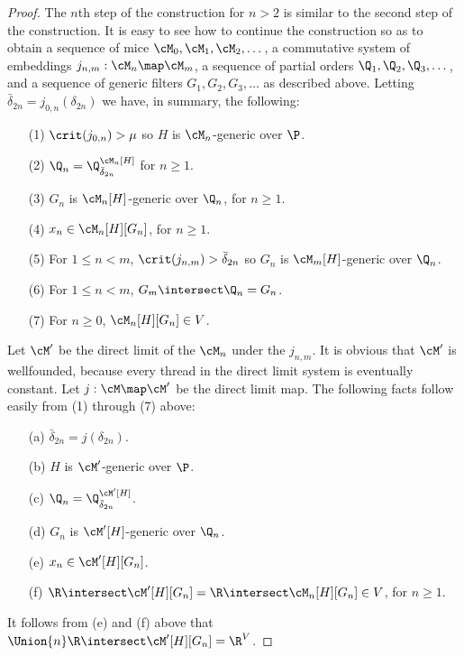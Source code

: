 \begin{proof}
The $n$th step of the construction for $n>2$ is similar to the
second step of the construction. It is easy to see how to continue the
construction so as to obtain a sequence of mice
$\cM_0, \cM_1, \cM_2, \dots$,  a commutative system of embeddings
$j_{n,m}:\cM_n\map\cM_m$, a sequence of partial orders
$\Q_1, \Q_2, \Q_3, \dots$, and a sequence of generic filters
$G_1, G_2, G_3, \dots$ as described above. Letting
$\bar{\delta}_{2n}=j_{0,n}(\delta_{2n})$ we have, in summary, the following:
\begin{itemize}
\item[(1)] $\crit(j_{0,n})>\mu$ so $H$ is $\cM_n$-generic over $\P$.
\item[(2)] $\Q_n = \Q_{\bar{\delta}_{2n}}^{\cM_n[H]}$ for $n\geq 1$.
\item[(3)] $G_n$ is $\cM_n[H]$-generic over $\Q_n$, for $n\geq 1$.
\item[(4)] $x_n\in\cM_n[H][G_n]$, for $n\geq 1$.
\item[(5)] For $1\leq n < m$, $\crit(j_{n,m})>\bar{\delta}_{2n}$ so
           $G_n$ is $\cM_m[H]$-generic over $\Q_n$.
\item[(6)] For $1\leq n < m$, $G_m\intersect \Q_n= G_n$.
\item[(7)] For $n\geq 0$, $\cM_n[H][G_n]\in V$.
\end{itemize}

Let $\cM^{\prime}$ be the direct limit of the $\cM_n$ under the
$j_{n,m}$. It is obvious that $\cM^{\prime}$ is wellfounded, because
every thread in the direct limit system is eventually constant.
Let $j:\cM\map\cM^{\prime}$ be the direct limit map.
The
following facts follow easily from (1) through (7) above:
\begin{itemize}
\item[(a)] $\bar{\delta}_{2n} = j(\delta_{2n})$.
\item[(b)] $H$ is $\cM^\prime$-generic over $\P$.
\item[(c)] $\Q_n=\Q_{\bar{\delta}_{2n}}^{\cM^{\prime}[H]}$.
\item[(d)] $G_n$ is $\cM^{\prime}[H]$-generic over $\Q_n$.
\item[(e)] $x_n\in\cM^{\prime}[H][G_n]$.
\item[(f)] $\R\intersect\cM^{\prime}[H][G_n]=
            \R\intersect\cM_n[H][G_n]\in V$, for $n\geq 1$.
\end{itemize}
It follows from (e) and (f) above that
$\Union{n}\R\intersect\cM^{\prime}[H][G_n]=\R^{V}$.


\end{proof}
